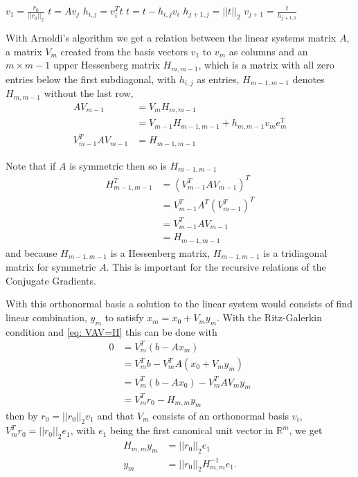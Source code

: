 \begin{algorithm}[H]
    \caption{Arnoldi algorithm \cite{Vorst03}.}\label{alg: Arnoldi}
    \begin{algorithmic}
        \State \(v_1=\frac{r_0}{||r_0||_2}\)
            \State \(t=Av_j\)
                \State \(h_{i,j}=v_i^Tt\)
                \State \(t=t-h_{i,j}v_i\)
            \EndLoop
            \State \(h_{j+1,j}=||t||_2\)
            \State \(v_{j+1}=\frac{t}{h_{j+1,1}}\)
        \EndLoop
    \end{algorithmic}
\end{algorithm}

With Arnoldi's algorithm we get a relation between the linear systems matrix \(A\), a matrix \(V_m\) created from the basis  vectors \(v_1\) to \(v_m\) as columns and an \(m\times m-1\) upper Hessenberg matrix \(H_{m,m-1}\), which is a matrix with all zero entries below the first subdiagonal, with \(h_{i,j}\) as entries, \(H_{m-1,m-1}\) denotes \(H_{m,m-1}\) without the last row,
\begin{align}
    AV_{m-1}&=V_{m}H_{m,m-1}\label{eq: AV=VH}\\
    &=V_{m-1}H_{m-1,m-1}+h_{m,m-1}v_m e_m^T\\
    V^T_{m-1}AV_{m-1}&=H_{m-1,m-1}\label{eq: VAV=H}
\end{align}

\noindent Note that if \(A\) is symmetric then so is \(H_{m-1,m-1}\) 
\begin{align*}
    H_{m-1,m-1}^T & =(V^T_{m-1}AV_{m-1})^T\\
    &=V^T_{m-1}A^T(V_{m-1}^T)^T\\
    &=V^T_{m-1}AV_{m-1}\\
    &=H_{m-1,m-1}
\end{align*}
and because \(H_{m-1,m-1}\) is a Hessenberg matrix, \(H_{m-1,m-1}\) is a tridiagonal matrix for symmetric \(A\). This is important for the recursive relations of the Conjugate Gradients.

With this orthonormal basis a solution to the linear system would consists of find linear combination, \(y_m\) to satisfy \(x_m=x_0+V_my_m\). With the Ritz-Galerkin condition and \eqref{eq: VAV=H} this can be done with
\begin{align*}
    0&=V_m^T(b-Ax_m)\\
    &=V_m^Tb-V_m^TA(x_0+V_my_m)\\
    &=V_m^T(b-Ax_0)-V_m^TAV_my_m\\
    &=V_m^Tr_0-H_{m,m}y_m
\end{align*}
then by \(r_0=||r_0||_2v_1\) and that \(V_m\) consists of an orthonormal basis \(v_i\), \(V_m^Tr_0=||r_0||_2e_1\), with \(e_1\) being the first canonical unit vector in \(\mathbb{R}^m\), we get
\begin{align*}
    H_{m,m}y_m&=||r_0||_2e_1\\
    y_m&=||r_0||_2H_{m,m}^{-1}e_1.
\end{align*}

